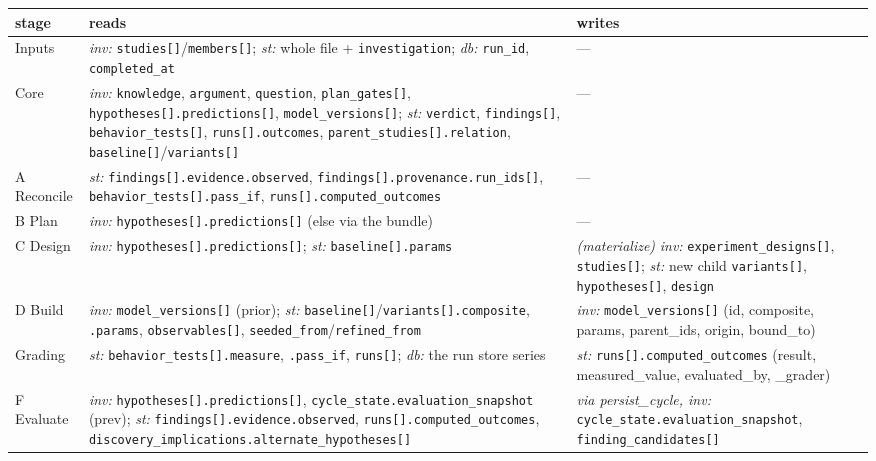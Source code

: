 \documentclass[11pt]{article}
\newcommand{\code}[1]{\texttt{\small #1}}
\begin{document}
\begin{center}\footnotesize
\begin{tabularx}{\textwidth}{@{}>{\raggedright\arraybackslash}p{} Y Y@{}}
\toprule
\textbf{stage} & \textbf{reads} & \textbf{writes}\\
\midrule
Inputs & \textit{inv:} \code{studies[]}/\code{members[]}; \textit{st:} whole file + \code{investigation}; \textit{db:} \code{run\_id}, \code{completed\_at} & ---\\
\addlinespace[2pt]
Core & \textit{inv:} \code{knowledge}, \code{argument}, \code{question}, \code{plan\_gates[]}, \code{hypotheses[].predictions[]}, \code{model\_versions[]}; \textit{st:} \code{verdict}, \code{findings[]}, \code{behavior\_tests[]}, \code{runs[].outcomes}, \code{parent\_studies[].relation}, \code{baseline[]}/\code{variants[]} & ---\\
\addlinespace[2pt]
A Reconcile & \textit{st:} \code{findings[].evidence.observed}, \code{findings[].provenance.run\_ids[]}, \code{behavior\_tests[].pass\_if}, \code{runs[].computed\_outcomes} & ---\\
\addlinespace[2pt]
B Plan & \textit{inv:} \code{hypotheses[].predictions[]} (else via the bundle) & ---\\
\addlinespace[2pt]
C Design & \textit{inv:} \code{hypotheses[].predictions[]}; \textit{st:} \code{baseline[].params} & \textit{(materialize)} \textit{inv:} \code{experiment\_designs[]}, \code{studies[]}; \textit{st:} new child \code{variants[]}, \code{hypotheses[]}, \code{design}\\
\addlinespace[2pt]
D Build & \textit{inv:} \code{model\_versions[]} (prior); \textit{st:} \code{baseline[]}/\code{variants[].composite}, \code{.params}, \code{observables[]}, \code{seeded\_from}/\code{refined\_from} & \textit{inv:} \code{model\_versions[]} (id, composite, params, parent\_ids, origin, bound\_to)\\
\addlinespace[2pt]
Grading & \textit{st:} \code{behavior\_tests[].measure}, \code{.pass\_if}, \code{runs[]}; \textit{db:} the run store series & \textit{st:} \code{runs[].computed\_outcomes} (result, measured\_value, evaluated\_by, \_grader)\\
\addlinespace[2pt]
F Evaluate & \textit{inv:} \code{hypotheses[].predictions[]}, \code{cycle\_state.evaluation\_snapshot} (prev); \textit{st:} \code{findings[].evidence.observed}, \code{runs[].computed\_outcomes}, \code{discovery\_implications.alternate\_hypotheses[]} & \textit{via persist\_cycle, inv:} \code{cycle\_state.evaluation\_snapshot}, \code{finding\_candidates[]}\\

\end{tabularx}
\end{center}
\end{document}
